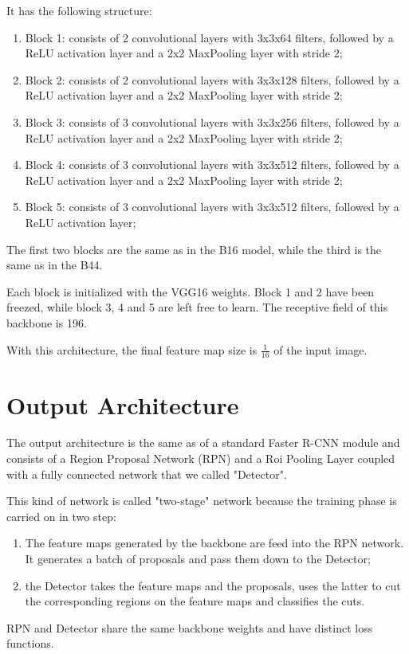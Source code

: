 \documentclass[a4paper,10pt]{report}
\begin{document}
It has the following structure:
\begin{enumerate}
  \item Block 1: consists of 2 convolutional layers with 3x3x64 filters, followed by a ReLU activation layer and a 2x2 MaxPooling layer with stride 2;
  \item Block 2: consists of 2 convolutional layers with 3x3x128 filters, followed by a ReLU activation layer and a 2x2 MaxPooling layer with stride 2;
  \item Block 3: consists of 3 convolutional layers with 3x3x256 filters, followed by a ReLU activation layer and a 2x2 MaxPooling layer with stride 2;
  \item Block 4: consists of 3 convolutional layers with 3x3x512 filters, followed by a ReLU activation layer and a 2x2 MaxPooling layer with stride 2;
  \item Block 5: consists of 3 convolutional layers with 3x3x512 filters, followed by a ReLU activation layer;
\end{enumerate}
The first two blocks are the same as in the B16 model, while the third is the same as in the B44.

Each block is initialized with the VGG16 weights. Block 1 and 2 have been freezed, while block 3, 4 and 5 are left free to learn. The receptive field of this backbone is 196.

With this architecture, the final feature map size is $\frac{1}{16}$ of the input image.

\section{Output Architecture}\label{sec:output-architecture}
The output architecture is the same as of a standard Faster R-CNN module and consists of a Region Proposal Network (RPN) and a Roi Pooling Layer coupled with a fully connected network that we called "Detector".

This kind of network is called "two-stage" network because the training phase is carried on in two step:
\begin{enumerate}
    \item The feature maps generated by the backbone are feed into the RPN network. It generates a batch of proposals and pass them down to the Detector;
    \item the Detector takes the feature maps and the proposals, uses the latter to cut the corresponding regions on the feature maps and classifies the cuts.
\end{enumerate}
RPN and Detector share the same backbone weights and have distinct loss functions.
\end{document}
